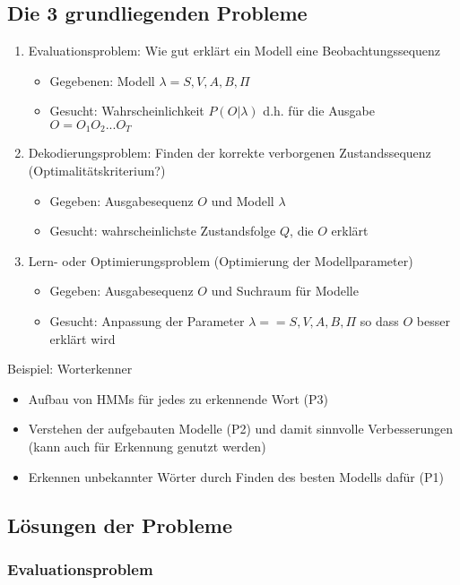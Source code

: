 \documentclass[paper=a4, fontsize=11pt]{scrartcl} %
\numberwithin{equation}{section} %
\numberwithin{figure}{section} %
\numberwithin{table}{section} %
\begin{document}
\subsection{Die 3 grundliegenden Probleme}

\begin{enumerate}
\item Evaluationsproblem: Wie gut erklärt ein Modell eine Beobachtungssequenz
\begin{itemize}
\item Gegebenen: Modell $\lambda = {S,V,A,B,\Pi}$
\item Gesucht: Wahrscheinlichkeit $P(O|\lambda)$ d.h. für die Ausgabe $O = O_1 O_2...O_T$
\end{itemize}
\item Dekodierungsproblem: Finden der korrekte verborgenen Zustandssequenz (Optimalitätskriterium?)
\begin{itemize}
\item Gegeben: Ausgabesequenz $O$ und Modell $\lambda$
\item Gesucht: wahrscheinlichste Zustandsfolge $Q$, die $O$ erklärt
\end{itemize}
\item Lern- oder Optimierungsproblem (Optimierung der Modellparameter)
\begin{itemize}
\item Gegeben: Ausgabesequenz $O$ und Suchraum für Modelle
\item Gesucht: Anpassung der Parameter $\lambda = = {S,V,A,B,\Pi}$ so dass $O$ besser erklärt wird
\end{itemize}
\end{enumerate}

Beispiel: Worterkenner
\begin{itemize}
\item Aufbau von HMMs für jedes zu erkennende Wort (P3)
\item Verstehen der aufgebauten Modelle (P2) und damit sinnvolle Verbesserungen (kann auch für Erkennung genutzt werden)
\item Erkennen unbekannter Wörter durch Finden des besten Modells dafür (P1)
\end{itemize}

\subsection{Lösungen der Probleme}

\subsubsection{Evaluationsproblem}
\end{document}
